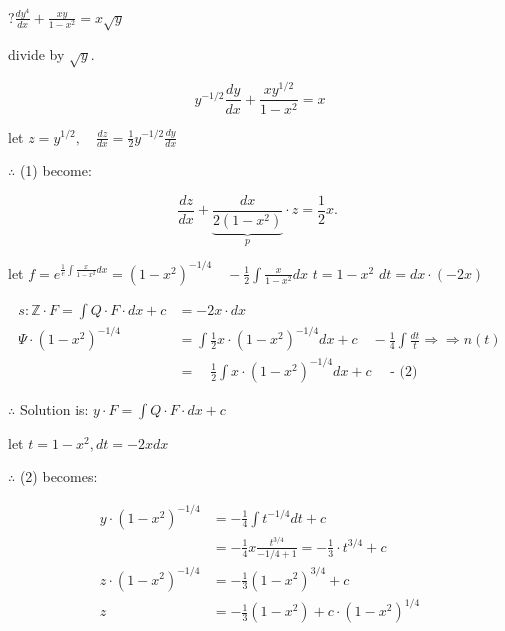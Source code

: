 \documentclass[12pt, a4paper]{article}
\begin{document}
$? \frac{d y^{4}}{d x}+\frac{x y}{1-x^2 }=x \sqrt{y}$

divide by $\sqrt{y}$.


\begin{equation*}
	y^{-1 / 2} \frac{d y}{d x}+\frac{x y^{1 / 2}}{1-x^2 }=x \tag{1}
\end{equation*}


let $z=y^{1 / 2}, \quad \frac{d z}{d x}=\frac{1}{2} y^{-1 / 2} \frac{d y}{d x}$

$\therefore$ (1) become:

$$
	\frac{d z}{d x}+\underbrace{\frac{d x}{2\left(1-x^2 \right)}}_{p} \cdot z=\frac{1}{2} x \text{. }
$$

let $f=e^{\frac{1}{e} \int \frac{x}{1-x^2 } d x}=\left(1-x^2 \right)^{-1 / 4} \quad-\frac{1}{2} \int \frac{x}{1-x^2 } d x$ $t=1-x^2 $ $d t=d x \cdot(-2 x)$


\begin{align*}
	s: \mathbb{Z} \cdot F=\int Q \cdot F \cdot d x+c & =-2 x \cdot d x                                                                                                               \\
	\Psi \cdot\left(1-x^2 \right)^{-1 / 4}           & =\int \frac{1}{2} x \cdot\left(1-x^2 \right)^{-1 / 4} d x+c \quad-\frac{1}{4} \int \frac{d t}{t} \Rightarrow \Rightarrow n(t) \\
	                                                 & =\quad \frac{1}{2} \int x \cdot\left(1-x^2 \right)^{-1 / 4} d x+c \quad \text{ - (2) }
\end{align*}


$\therefore$ Solution is: $y \cdot F=\int Q \cdot F \cdot d x+c$

let $t=1-x^2 , d t=-2 x d x$

$\therefore$ (2) becomes:

$$
	\begin{aligned}
		y \cdot\left(1-x^2 \right)^{-1 / 4} & =-\frac{1}{4} \int t^{-1 / 4} d t+c                                       \\
		                                    & =-\frac{1}{4} x \frac{t^{3 / 4}}{-1 / 4+1}=-\frac{1}{3} \cdot t^{3 / 4}+c \\
		z \cdot\left(1-x^2 \right)^{-1 / 4} & =-\frac{1}{3}\left(1-x^2 \right)^{3 / 4}+c                                \\
		z                                   & =-\frac{1}{3}\left(1-x^2 \right)+c \cdot\left(1-x^2 \right)^{1 / 4}
	\end{aligned}
$$
\end{document}
